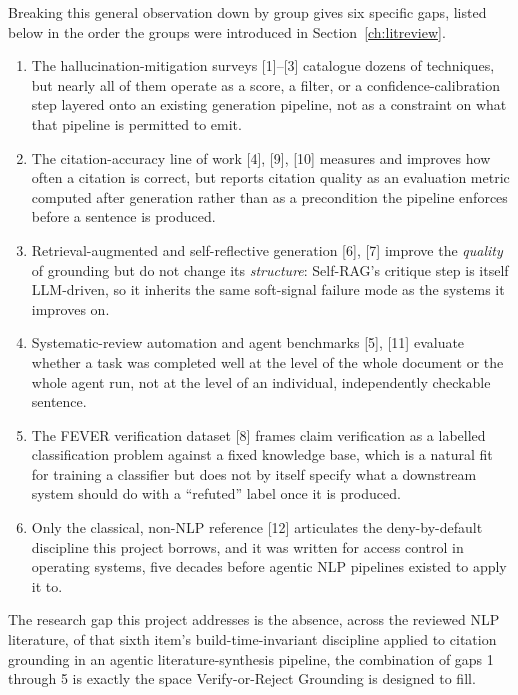 \documentclass[12pt,a4paper]{report}
\begin{document}
Breaking this general observation down by group gives six specific gaps,
listed below in the order the groups were introduced in
Section~\ref{ch:litreview}.
\begin{enumerate}
  \item The hallucination-mitigation surveys [1]--[3] catalogue dozens of
        techniques, but nearly all of them operate as a score, a filter, or a
        confidence-calibration step layered onto an existing generation
        pipeline, not as a constraint on what that pipeline is permitted to
        emit.
  \item The citation-accuracy line of work [4], [9], [10] measures and
        improves how often a citation is correct, but reports citation quality
        as an evaluation metric computed after generation rather than as a
        precondition the pipeline enforces before a sentence is produced.
  \item Retrieval-augmented and self-reflective generation [6], [7] improve
        the \emph{quality} of grounding but do not change its
        \emph{structure}: Self-RAG's critique step is itself LLM-driven, so it
        inherits the same soft-signal failure mode as the systems it improves
        on.
  \item Systematic-review automation and agent benchmarks [5], [11] evaluate
        whether a task was completed well at the level of the whole document
        or the whole agent run, not at the level of an individual,
        independently checkable sentence.
  \item The FEVER verification dataset [8] frames claim verification as a
        labelled classification problem against a fixed knowledge base, which
        is a natural fit for training a classifier but does not by itself
        specify what a downstream system should do with a ``refuted'' label
        once it is produced.
  \item Only the classical, non-NLP reference [12] articulates the
        deny-by-default discipline this project borrows, and it was written
        for access control in operating systems, five decades before agentic
        NLP pipelines existed to apply it to.
\end{enumerate}
The research gap this project addresses is the absence, across the reviewed
NLP literature, of that sixth item's build-time-invariant discipline applied
to citation grounding in an agentic literature-synthesis pipeline, the
combination of gaps 1 through 5 is exactly the space Verify-or-Reject
Grounding is designed to fill.
\end{document}
